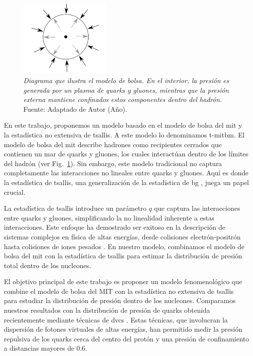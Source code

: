 \begin{figure}
    \centering
    \includegraphics[width=0.4\textwidth]{./Images/Bag model.png}
    \caption[Diagrama de bolsa]{\emph{Diagrama que ilustra el modelo de bolsa. En el interior, la presión es generada por un plasma de quarks y gluones, mientras que la presión externa mantiene confinados estos componentes dentro del hadrón.} Fuente: Adaptado de Autor (Año).}
    \label{fig:Bolsa }
\end{figure}

En este trabajo, proponemos un modelo basado en el modelo de bolsa del \acrfull{mit} \cite{Chodos_1974,Chodos1974a} y la estadística no extensiva de \Gls{tsallis}. A este modelo lo denominamos \acrfull{t-mitbm}. El modelo de bolsa del \acrshort{mit} describe hadrones como recipientes cerrados que contienen un mar de quarks y gluones, los cuales interactúan dentro de los límites del hadrón (ver Fig.~\ref{fig:Bolsa }). Sin embargo, este modelo tradicional no captura completamente las interacciones no lineales entre quarks y gluones. Aquí es donde la estadística de \Gls{tsallis}, una generalización de la estadística de \acrfull{bg} \cite{Tsallis1988,Beck_2003,Tsallis2009,Tsallis_2014,Tsallis_2009}, juega un papel crucial.

La estadística de \Gls{tsallis} introduce un parámetro $q$ que captura las interacciones entre quarks y gluones, simplificando la no linealidad inherente a estas interacciones. Este enfoque ha demostrado ser exitoso en la descripción de sistemas complejos en física de altas energías, desde colisiones electrón-positrón \cite{Bediaga_2000,Collaboration1984} hasta colisiones de iones pesados \cite{Saraswat_2018,Saraswat_2017}. En nuestro modelo, combinamos el modelo de bolsa del \acrshort{mit} con la estadística de \Gls{tsallis} para estimar la distribución de presión total dentro de los nucleones.

El objetivo principal de este trabajo es proponer un modelo fenomenológico que combine el modelo de bolsa del MIT con la estadística no extensiva de \Gls{tsallis} para estudiar la distribución de presión dentro de los nucleones. Comparamos nuestros resultados con la distribución de presión de quarks obtenida recientemente mediante técnicas de \acrfull{dvcs} \cite{Burkert_2018}. Estas técnicas, que involucran la dispersión de fotones virtuales de altas energías, han permitido medir la presión repulsiva de los quarks cerca del centro del protón y una presión de confinamiento a distancias mayores de $0.6$.

